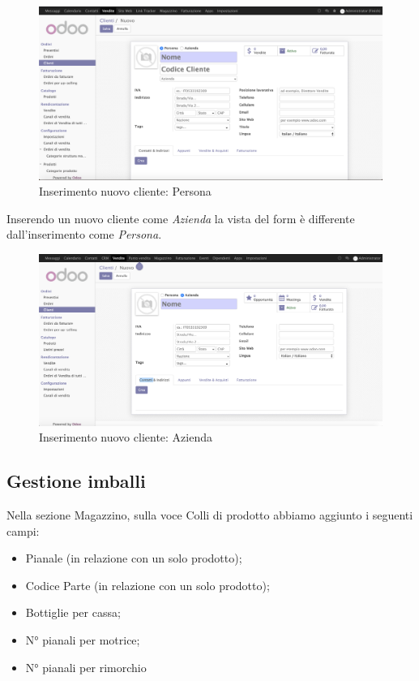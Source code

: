 \begin{figure}[H]
	\begin{center} \includegraphics[scale=0.3]{figures/ibg_code}
		\caption[Inserimento nuovo cliente: Persona]{Inserimento nuovo cliente: Persona}
		\label{fig:ibg_code}
	\end{center}
\end{figure}
\newpage
Inserendo un nuovo cliente come \textit{Azienda} la vista del form è differente dall'inserimento come \textit{Persona}.
\begin{figure}[H]
	\begin{center} \includegraphics[scale=0.3]{figures/empresa}
		\caption[Inserimento nuovo cliente: Azienda]{Inserimento nuovo cliente: Azienda}
		\label{fig:empresa}
	\end{center}
\end{figure}
\newpage

\subsection{Gestione imballi}
Nella sezione Magazzino, sulla voce Colli di prodotto abbiamo aggiunto i seguenti campi:
\begin{itemize}
\item Pianale (in relazione con un solo prodotto);
\item Codice Parte (in relazione con un solo prodotto);
\item Bottiglie per cassa;
\item N° pianali per motrice;
\item N° pianali per rimorchio
\end{itemize}


